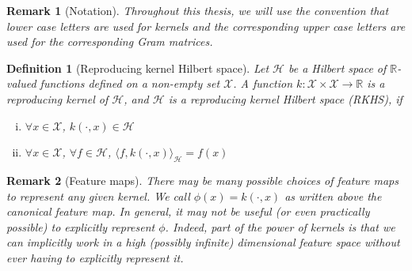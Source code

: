 \documentclass[12pt]{article}
\newtheorem*{remark}{Remark}
\newtheorem{definition}{Definition}
\numberwithin{claim}{section}
\numberwithin{lemma}{section}
\numberwithin{theorem}{section}
\begin{document}
\begin{remark}[Notation]
Throughout this thesis, we will use the convention that lower case letters are used for kernels and the corresponding upper case letters are used for the corresponding Gram matrices.
\end{remark}


\begin{definition}[Reproducing kernel Hilbert space]
Let $\mathcal{H}$ be a Hilbert space of $\mathbb{R}$-valued functions defined on a non-empty set $\mathcal{X}$. A function $k:\mathcal{X}\times \mathcal{X} \longrightarrow \mathbb{R}$ is a \emph{reproducing kernel} of $\mathcal{H}$, and $\mathcal{H}$ is a reproducing kernel Hilbert space (RKHS), if
\begin{enumerate}[(i)]
\item $\forall x \in \mathcal{X}$, $k(\cdot, x) \in \mathcal{H}$
\item $\forall x \in \mathcal{X}$, $\forall f \in \mathcal{H}$, $\langle f , k(\cdot, x) \rangle_\mathcal{H} = f(x)$
\end{enumerate}
\end{definition}

\begin{remark}[Feature maps]
There may be many possible choices of feature maps to represent any given kernel. We call $\phi(x) = k(\cdot,x)$ as written above the \emph{canonical feature map}. In general, it may not be useful (or even practically possible) to explicitly represent $\phi$. Indeed, part of the power of kernels is that we can implicitly work in a high (possibly infinite) dimensional feature space without ever having to explicitly represent it.
\end{remark}
\end{document}
